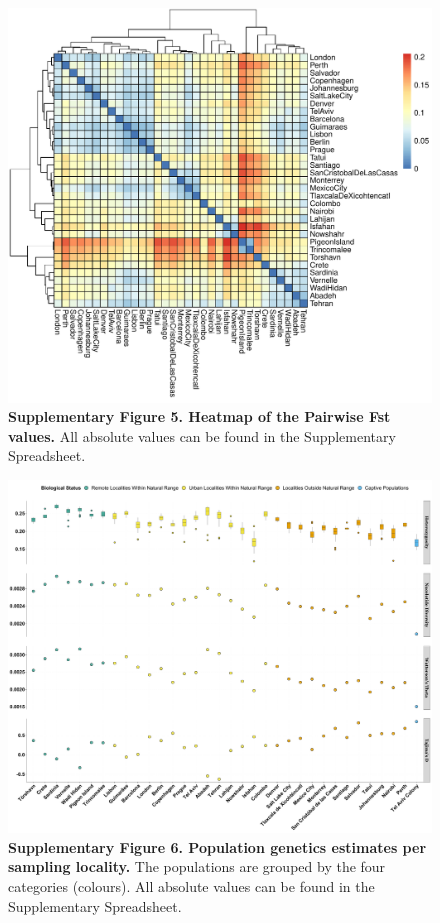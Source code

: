 \documentclass[twoside, british, a4paper]{article}
\begin{document}
\begin{figure}
\centering
\includegraphics[width=1\textwidth]{../FPG--Pipeline/FPG--Plots/FPG--Fst/FPG--Fst.pdf}
\captionsetup{labelformat=empty}
\caption[Supplementary Figure 5. Heatmap of the Pairwise Fst values.]{\textbf{Supplementary Figure 5. Heatmap of the Pairwise Fst values.} All absolute values can be found in the Supplementary Spreadsheet.}
\label{MainText:FPG--Fst}
\end{figure}

\begin{figure}
\centering
\includegraphics[width=1\textwidth]{../FPG--Pipeline/FPG--Plots/FPG--PopGenEstimates/FPG--PopGenEstimates.pdf}
\captionsetup{labelformat=empty}
\caption[Supplementary Figure 6. Population genetics estimates per sampling locality.]{\textbf{Supplementary Figure 6. Population genetics estimates per sampling locality.} The populations are grouped by the four categories (colours). All absolute values can be found in the Supplementary Spreadsheet.}
\label{MainText:FPG--PopGenEstimates}
\end{figure}
\end{document}
